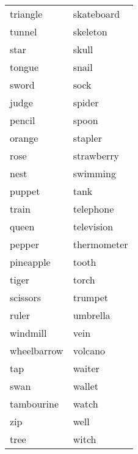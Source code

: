 \documentclass[
  man,floatsintext]{apa6}
\begin{document}
\begin{longtable}{ll}
\addlinespace
triangle & skateboard\\
tunnel & skeleton\\
star & skull\\
tongue & snail\\
sword & sock\\
\addlinespace
judge & spider\\
pencil & spoon\\
orange & stapler\\
rose & strawberry\\
nest & swimming\\
\addlinespace
puppet & tank\\
train & telephone\\
queen & television\\
pepper & thermometer\\
pineapple & tooth\\
\addlinespace
tiger & torch\\
scissors & trumpet\\
ruler & umbrella\\
windmill & vein\\
wheelbarrow & volcano\\
\addlinespace
tap & waiter\\
swan & wallet\\
tambourine & watch\\
zip & well\\
tree & witch\\
\bottomrule
\end{longtable}
\end{document}
